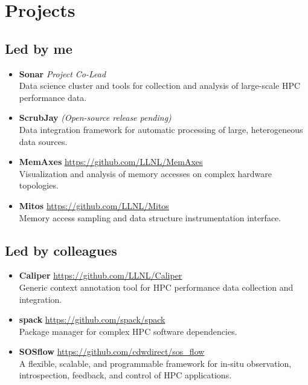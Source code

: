 \section{Projects}

\subsection{Led by me}

\begin{itemize}

\item \textbf{Sonar} \textit{Project Co-Lead}  \\
    Data science cluster and tools for collection and analysis of large-scale HPC performance data.

\item \textbf{ScrubJay} \textit{(Open-source release pending)} \\
    Data integration framework for automatic processing of large, heterogeneous data sources.

\item \textbf{MemAxes} \url{https://github.com/LLNL/MemAxes} \\
    Visualization and analysis of memory accesses on complex hardware topologies.

\item \textbf{Mitos} \url{https://github.com/LLNL/Mitos} \\
    Memory access sampling and data structure instrumentation interface.

\end{itemize}

\subsection{Led by colleagues}

\begin{itemize}

    \item \textbf{Caliper} \url{https://github.com/LLNL/Caliper}  \\
        Generic context annotation tool for HPC performance data collection and integration.

    \item \textbf{spack} \url{https://github.com/spack/spack}  \\
        Package manager for complex HPC software dependencies.

    \item \textbf{SOSflow} \url{https://github.com/cdwdirect/sos_flow} \\
        A flexible, scalable, and programmable framework for in-situ observation, introspection, feedback, and control of HPC applications.

\end{itemize}

